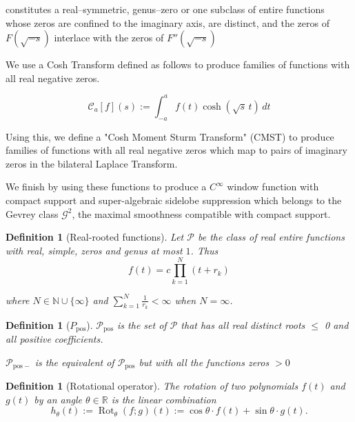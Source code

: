 \documentclass[11pt]{article}
\theoremstyle{breakdef}
\newtheorem{definition}[theorem]{Definition}
\begin{document}
constitutes a real--symmetric, genus--zero or one subclass of entire functions whose zeros are confined to the imaginary axis, are distinct, and the zeros of $F(\sqrt{-s})$ interlace with the zeros of $F''(\sqrt{-s})$



We use a Cosh Transform defined as follows to produce families of functions with all real negative zeros.

\begin{equation}
\mathcal{C}_{a}[f](s) := \int_{-a}^{a} f(t)\cosh(\sqrt{s}\,t)\,dt
\end{equation}

Using this, we define a "Cosh Moment Sturm Transform" (CMST) to produce families of functions with all real negative zeros which map to pairs of imaginary zeros in the bilateral Laplace Transform.

We finish by using these functions to produce a $C^\infty$ window function with compact support and super-algebraic sidelobe suppression which belongs to the Gevrey 
class $\mathcal{G}^2$, the maximal smoothness compatible with 
compact support.

\begin{definition}[Real-rooted functions]\label{def:P2}
Let $\mathcal{P}$ be the class of real entire functions with real, simple,
 zeros and genus at most $1$.  Thus
\begin{equation}
f(t) = c \prod_{k=1}^{N} (t+r_k)
\end{equation}

where $N\in\mathbb{N}\cup\{\infty\}$ and 
$\sum_{k=1}^N \frac{1}{r_k} < \infty$ when $N=\infty$.
\end{definition}

\begin{definition}[$P_{\mathrm{pos}}$]\label{def:Ppos}
$\mathcal{P_{\mathrm{pos}}}$ is the set of $\mathcal{P}$ that has all real distinct roots $\le$ 0 and all positive coefficients.

$\mathcal{P_{\mathrm{pos-}}}$ is the equivalent of $\mathcal{P_{\mathrm{pos}}}$ but with all the functions zeros $> 0$

\end{definition}

\begin{definition}[Rotational operator]\label{def:rotation}
The \emph{rotation} of two polynomials $f(t)$ and $g(t)$ by an angle
$\theta \in \mathbb{R}$ is the linear combination
\[
h_\theta(t)
:=
\operatorname{Rot}_{\theta}(f;g)(t)
:=
\cos\theta \cdot f(t) + \sin\theta \cdot g(t).
\]
\end{definition}
\end{document}
